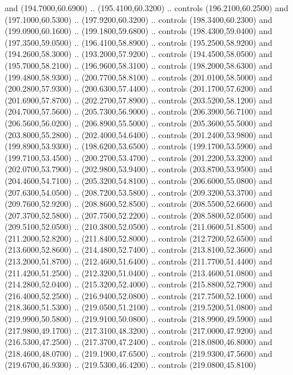 {\begin{scope}[y=0.80pt, x=0.80pt, yscale=-1, xscale=1, inner sep=0pt, outer sep=0pt, #1]
      and (194.7000,60.6900) .. (195.4100,60.3200) .. controls (196.2100,60.2500)
      and (197.1000,60.5300) .. (197.9200,60.3200) .. controls (198.3400,60.2300)
      and (199.0900,60.1600) .. (199.1800,59.6800) .. controls (198.4300,59.0400)
      and (197.3500,59.0500) .. (196.4100,58.8900) .. controls (195.2500,58.9200)
      and (194.2600,58.3000) .. (193.2000,57.9200) .. controls (194.4500,58.0500)
      and (195.7000,58.2100) .. (196.9600,58.3100) .. controls (198.2000,58.6300)
      and (199.4800,58.9300) .. (200.7700,58.8100) .. controls (201.0100,58.5000)
      and (200.2800,57.9300) .. (200.6300,57.4400) .. controls (201.1700,57.6200)
      and (201.6900,57.8700) .. (202.2700,57.8900) .. controls (203.5200,58.1200)
      and (204.7000,57.5600) .. (205.7300,56.9000) .. controls (206.3900,56.7100)
      and (206.5600,56.0200) .. (206.8900,55.5000) .. controls (205.3600,55.5000)
      and (203.8000,55.2800) .. (202.4000,54.6400) .. controls (201.2400,53.9800)
      and (199.8900,53.9300) .. (198.6200,53.6500) .. controls (199.1700,53.5900)
      and (199.7100,53.4500) .. (200.2700,53.4700) .. controls (201.2200,53.3200)
      and (202.0700,53.7900) .. (202.9800,53.9400) .. controls (203.8700,53.9500)
      and (204.4600,54.7100) .. (205.3200,54.8100) .. controls (206.6000,55.0800)
      and (207.6300,54.0500) .. (208.7200,53.5800) .. controls (209.3200,53.3700)
      and (209.7600,52.9200) .. (208.8600,52.8500) .. controls (208.5500,52.6600)
      and (207.3700,52.5800) .. (207.7500,52.2200) .. controls (208.5800,52.0500)
      and (209.5100,52.0500) .. (210.3800,52.0500) .. controls (211.0600,51.8500)
      and (211.2000,52.8200) .. (211.8400,52.8000) .. controls (212.7200,52.6500)
      and (213.6000,52.8600) .. (214.4800,52.7400) .. controls (213.8100,52.3600)
      and (213.2000,51.8700) .. (212.4600,51.6400) .. controls (211.7700,51.4400)
      and (211.4200,51.2500) .. (212.3200,51.0400) .. controls (213.4600,51.0800)
      and (214.2800,52.0400) .. (215.3200,52.4000) .. controls (215.8800,52.7900)
      and (216.4000,52.2500) .. (216.9400,52.0800) .. controls (217.7500,52.1000)
      and (218.3600,51.5300) .. (219.0500,51.2100) .. controls (219.5200,51.0800)
      and (219.9900,50.5800) .. (219.9100,50.0800) .. controls (218.9900,49.5900)
      and (217.9800,49.1700) .. (217.3100,48.3200) .. controls (217.0000,47.9200)
      and (216.5300,47.2500) .. (217.3700,47.2400) .. controls (218.0800,46.8000)
      and (218.4600,48.0700) .. (219.1900,47.6500) .. controls (219.9300,47.5600)
      and (219.6700,46.9300) .. (219.5300,46.4200) .. controls (219.0800,45.8100)

\end{scope}}
